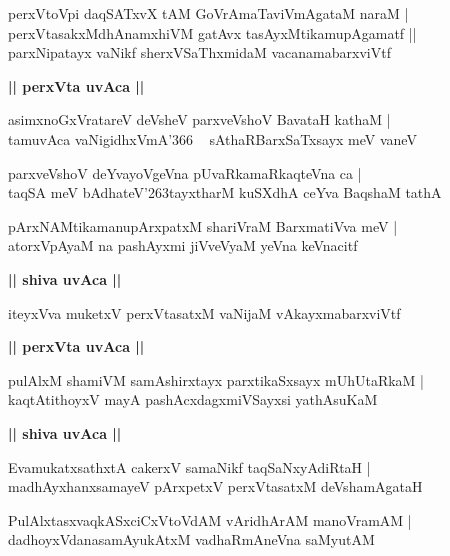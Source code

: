 \documentclass[twoside,12pt,openright]{book}
\def\S{\char'263}
\newcounter{shloka}[chapter]
\def\uvaca#1{\centerline{{\large\textbf{#1}}}}
\begin{document}
\begin{shloka}%
perxVtoVpi daqSATxvX tAM GoVrAmaTaviVmAgataM naraM |\\
perxVtasakxMdhAnamxhiVM gatAvx tasAyxMtikamupAgamatf ||\\
parxNipatayx vaNikf sherxVSaThxmidaM vacanamabarxviVtf
\end{shloka}

\uvaca{|| perxVta uvAca ||}

\begin{shloka}%
asimxnoGxVratareV deVsheV parxveVshoV BavataH kathaM |\\
tamuvAca vaNigidhxVmA\char'366 ~ sAthaRBarxSaTxsayx meV vaneV 
\end{shloka}

\begin{shloka}%
parxveVshoV deYvayoVgeVna pUvaRkamaRkaqteVna ca |\\
taqSA meV bAdhateV\S tayxtharM kuSXdhA ceYva BaqshaM tathA
\end{shloka}

\begin{shloka}%
pArxNAMtikamanupArxpatxM shariVraM BarxmatiVva meV |\\
atorxVpAyaM na pashAyxmi jiVveVyaM yeVna keVnacitf
\end{shloka}

\uvaca{|| shiva uvAca ||}

\begin{shloka}%
iteyxVva muketxV perxVtasatxM vaNijaM vAkayxmabarxviVtf
\end{shloka}

\uvaca{|| perxVta uvAca ||}

\begin{shloka}%
pulAlxM shamiVM samAshirxtayx parxtikaSxsayx mUhUtaRkaM |\\
kaqtAtithoyxV mayA pashAcxdagxmiVSayxsi yathAsuKaM
\end{shloka}

\uvaca{|| shiva uvAca ||}

\begin{shloka}%
EvamukatxsathxtA cakerxV samaNikf taqSaNxyAdiRtaH |\\
madhAyxhanxsamayeV pArxpetxV perxVtasatxM deVshamAgataH 
\end{shloka}

\begin{shloka}%
PulAlxtasxvaqkASxciCxVtoVdAM vAridhArAM manoVramAM |\\
dadhoyxVdanasamAyukAtxM vadhaRmAneVna saMyutAM 
\end{shloka}
\end{document}
